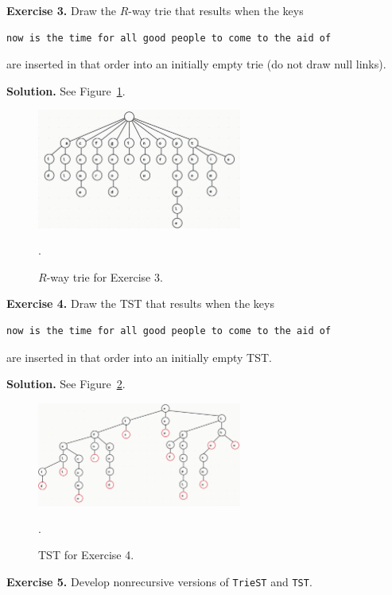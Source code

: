 \documentclass[12pt, a4paper]{article}
\newenvironment{ex}[2][Exercise]
{\par\medskip\noindent \textbf{#1 #2.}}
{\medskip}
\newenvironment{sol}[1][Solution]
{\par\medskip\noindent \textbf{#1.} }
{\medskip}
\begin{document}
	\begin{ex}{3}
		Draw the $R$-way trie that results when the keys
		\begin{lstlisting}[language={}]
			now is the time for all good people to come to the aid of
		\end{lstlisting}
		are inserted in that order into an initially empty trie (do not draw null links).
	\end{ex}
	\begin{sol}
		See Figure~\ref{fig:ex-03}.
		\begin{figure}
		\centering
		\includegraphics[width=0.6\textwidth]{exercise-03}
		\caption{$R$-way trie for Exercise 3.}
		\label{fig:ex-03}.
		\end{figure}
	\end{sol}
	\begin{ex}{4}
		Draw the TST that results when the keys
		\begin{lstlisting}[language={}]
			now is the time for all good people to come to the aid of
		\end{lstlisting}
		are inserted in that order into an initially empty TST.
	\end{ex}
	\begin{sol}
		See Figure~\ref{fig:ex-04}.
		\begin{figure}
			\centering
			\includegraphics[width=0.6\textwidth]{exercise-04}
			\caption{TST for Exercise 4.}
			\label{fig:ex-04}.
		\end{figure}
	\end{sol}
	\begin{ex}{5}
		Develop nonrecursive versions of \texttt{TrieST} and \texttt{TST}.
	\end{ex}
\end{document}
